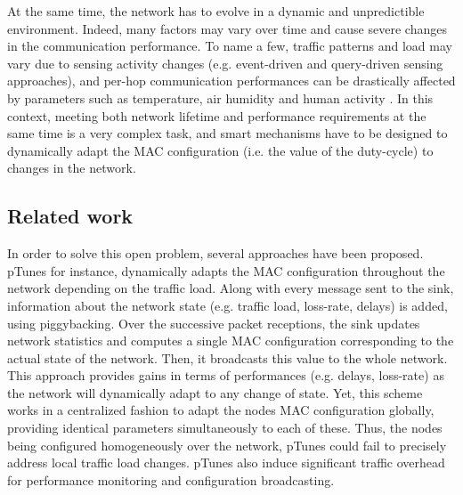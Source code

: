 \documentclass[12pt,journal,compsoc]{IEEEtran}
\begin{document}
At the same time, the network has to evolve in a dynamic and unpredictible environment. Indeed, many  factors may vary over time and cause severe changes in the communication performance. To name a few, traffic patterns and load may vary due to sensing activity changes (e.g. event-driven and query-driven sensing approaches), and per-hop communication performances can be drastically affected by parameters such as temperature, air humidity and human activity \cite{linkstability12, addvalue13, tempimpact10}.
In this context, meeting both network lifetime and performance requirements at the same time is a very complex task, and smart mechanisms have to be designed to dynamically adapt the MAC configuration (i.e. the value of the duty-cycle) to changes in the network.%

\subsection{Related work}


In order to solve this open problem, several approaches have been proposed. pTunes \cite{zfm12ptunes} for instance, dynamically adapts the MAC configuration throughout the network depending on the traffic load. Along with every message sent to the sink, information about the network state (e.g. traffic load, loss-rate, delays) is added, using piggybacking. Over the successive packet receptions, the sink updates network statistics and computes a single MAC configuration corresponding to the actual state of the network. Then, it broadcasts this value to the whole network. 
This approach provides gains in terms of performances (e.g. delays, loss-rate) as the network will dynamically adapt to any change of state. Yet, this scheme works in a centralized fashion to adapt the nodes MAC configuration globally, providing identical parameters simultaneously to each of these. Thus, the nodes being configured homogeneously over the network, pTunes could fail to precisely address local traffic load changes. pTunes also induce significant traffic overhead for performance monitoring and configuration broadcasting. 
\end{document}
